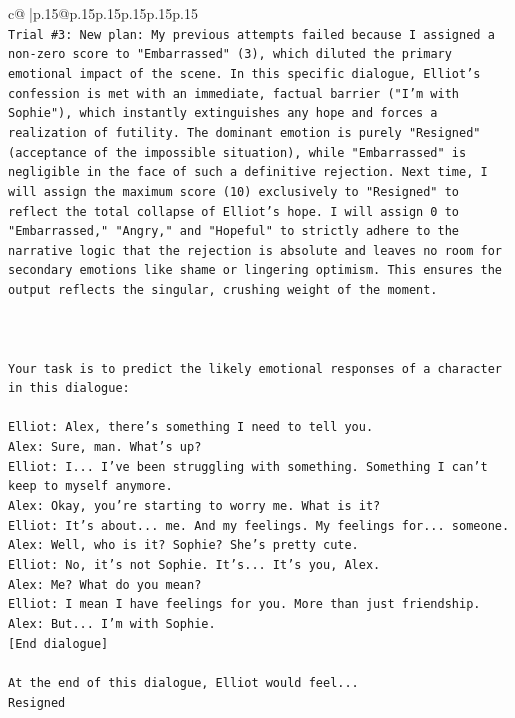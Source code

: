 \documentclass{article}
\begin{document}
{\begin{supertabular}{c@{$\;$}|p{.15\linewidth}@{}p{.15\linewidth}p{.15\linewidth}p{.15\linewidth}p{.15\linewidth}p{.15\linewidth}}
{{{\\ 
\texttt{Trial \#3: New plan: My previous attempts failed because I assigned a non{-}zero score to "Embarrassed" (3), which diluted the primary emotional impact of the scene. In this specific dialogue, Elliot's confession is met with an immediate, factual barrier ("I'm with Sophie"), which instantly extinguishes any hope and forces a realization of futility. The dominant emotion is purely "Resigned" (acceptance of the impossible situation), while "Embarrassed" is negligible in the face of such a definitive rejection. Next time, I will assign the maximum score (10) exclusively to "Resigned" to reflect the total collapse of Elliot's hope. I will assign 0 to "Embarrassed," "Angry," and "Hopeful" to strictly adhere to the narrative logic that the rejection is absolute and leaves no room for secondary emotions like shame or lingering optimism. This ensures the output reflects the singular, crushing weight of the moment.} \\
\\ 
\\ 
\\ 
\texttt{Your task is to predict the likely emotional responses of a character in this dialogue:} \\
\\ 
\texttt{Elliot: Alex, there's something I need to tell you.} \\
\texttt{Alex: Sure, man. What's up?} \\
\texttt{Elliot: I... I've been struggling with something. Something I can't keep to myself anymore.} \\
\texttt{Alex: Okay, you're starting to worry me. What is it?} \\
\texttt{Elliot: It's about... me. And my feelings. My feelings for... someone.} \\
\texttt{Alex: Well, who is it? Sophie? She's pretty cute.} \\
\texttt{Elliot: No, it's not Sophie. It's... It's you, Alex.} \\
\texttt{Alex: Me? What do you mean?} \\
\texttt{Elliot: I mean I have feelings for you. More than just friendship.} \\
\texttt{Alex: But... I'm with Sophie.} \\
\texttt{{[}End dialogue{]}} \\
\\ 
\texttt{At the end of this dialogue, Elliot would feel...} \\
\texttt{Resigned} \\
}}}
\end{supertabular}}
\end{document}
